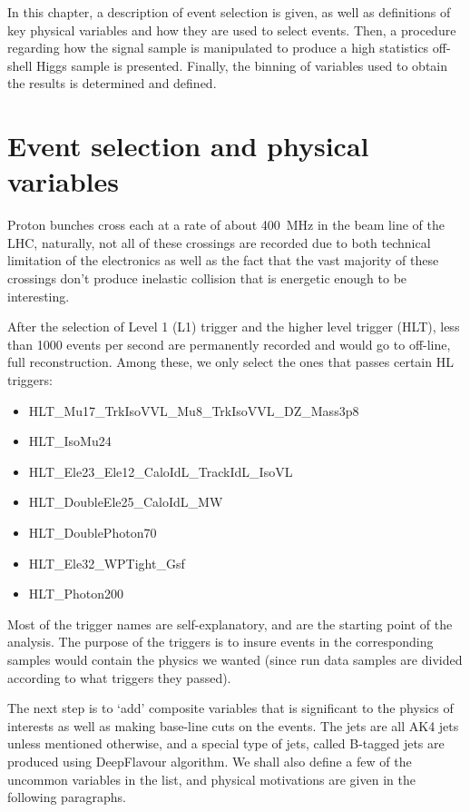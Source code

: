 In this chapter, a description of event selection is given, as well as definitions of
key physical variables and how they are used to select events. Then, a procedure regarding
how the signal sample is manipulated to produce a high statistics off-shell Higgs sample is presented.
Finally, the binning of variables used to obtain the results is determined and defined.

\section{Event selection and physical variables}
Proton bunches cross each at a rate of about \SI{400}{\mega\hertz} in the beam line of
the LHC, naturally, not all of these crossings are recorded due to both technical
limitation of the electronics as well as the fact that the vast majority of these
crossings don't produce inelastic collision that is energetic enough to be interesting.

After the selection of Level 1 (L1) trigger and the higher level trigger (HLT), less than 1000
events per second are permanently recorded and would go to off-line, full reconstruction. Among these,
we only select the ones that passes certain HL triggers:
\begin{itemize}
    \item HLT\_Mu17\_TrkIsoVVL\_Mu8\_TrkIsoVVL\_DZ\_Mass3p8
    \item HLT\_IsoMu24
    \item HLT\_Ele23\_Ele12\_CaloIdL\_TrackIdL\_IsoVL
    \item HLT\_DoubleEle25\_CaloIdL\_MW
    \item HLT\_DoublePhoton70
    \item HLT\_Ele32\_WPTight\_Gsf
    \item HLT\_Photon200
\end{itemize}
Most of the trigger names are self-explanatory, and are the starting point of the analysis. The
purpose of the triggers is to insure events in the corresponding samples would contain the physics
we wanted (since run data samples are divided according to what triggers they passed).

The next step is to `add' composite variables that is significant to the physics of interests as
well as making base-line cuts on the events.
The jets are all AK4 jets unless mentioned otherwise, and a special type of jets, called B-tagged
jets are produced using DeepFlavour algorithm.\cite{deepflavour} We shall also define a few of the
uncommon variables in the list, and physical motivations are given in the following
paragraphs.

